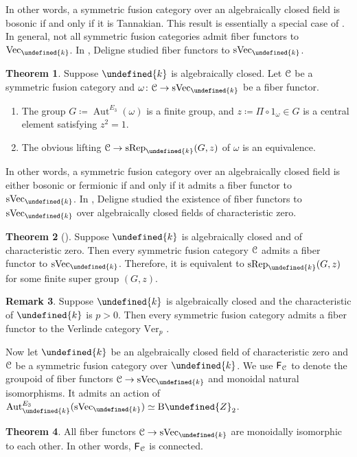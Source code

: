 \documentclass[10pt]{article}
\let\mathbb\undefined
\theoremstyle{definition}
\newtheorem{thm}{Theorem}[section]
\newtheorem{rem}[thm]{Remark}
\numberwithin{equation}{section}
\numberwithin{thm}{section}
\newcommand{\bnu}{\begin{enumerate}}
\newcommand{\enu}{\end{enumerate}}
\newcommand{\Zb}{\mathbb{Z}}
\newcommand{\bk}{\mathbb{k}}
\newcommand{\CC}{\EuScript{C}}
\newcommand{\SF}{\mathsf{F}}
\newcommand{\rmB}{\mathrm{B}}
\DeclareMathOperator{\Aut}{Aut}
\newcommand{\vect}{\mathrm{Vec}}
\newcommand{\svect}{\mathrm{sVec}}
\newcommand{\srep}{\mathrm{sRep}}
\begin{document}
In other words, a symmetric fusion category over an algebraically closed field is bosonic if and only if it is Tannakian. This result is essentially a special case of \cite[Theorem 2.11]{DM82}. In general, not all symmetric fusion categories admit fiber functors to $\vect_\bk$. In \cite[Section 8.19]{Del90}, Deligne studied fiber functors to $\svect_\bk$.

\begin{thm} \label{thm_Deligne_symmetric_fusion_super_lifting}
Suppose $\bk$ is algebraically closed. Let $\CC$ be a symmetric fusion category and $\omega \colon \CC \to \svect_\bk$ be a fiber functor.
\bnu[(1)]
\item The group $G \coloneqq \Aut^{E_3}(\omega)$ is a finite group, and $z \coloneqq \Pi \circ 1_\omega \in G$ is a central element satisfying $z^2 = 1$.
\item The obvious lifting $\CC \to \srep_\bk(G,z)$ of $\omega$ is an equivalence.
\enu
\end{thm}

In other words, a symmetric fusion category over an algebraically closed field is either bosonic or fermionic if and only if it admits a fiber functor to $\svect_\bk$. In \cite{Del02}, Deligne studied the existence of fiber functors to $\svect_\bk$ over algebraically closed fields of characteristic zero.

\begin{thm}[\textnormal{\cite[Corollary 0.8]{Del02}}] \label{thm_Deligne_classificaion_symmetric_fusion_category}
Suppose $\bk$ is algebraically closed and of characteristic zero. Then every symmetric fusion category $\CC$ admits a fiber functor to $\svect_\bk$. Therefore, it is equivalent to $\srep_\bk(G,z)$ for some finite super group $(G,z)$.
\end{thm}

\begin{rem}
Suppose $\bk$ is algebraically closed and the characteristic of $\bk$ is $p > 0$. Then every symmetric fusion category admits a fiber functor to the Verlinde category $\mathrm{Ver}_p$ \cite[Theorem 1.5]{Ost20}.
\end{rem}

Now let $\bk$ be an algebraically closed field of characteristic zero and $\CC$ be a symmetric fusion category over $\bk$. We use $\SF_\CC$ to denote the groupoid of fiber functors $\CC \to \svect_\bk$ and monoidal natural isomorphisms. It admits an action of $\Aut^{E_3}_\bk(\svect_\bk) \simeq \rmB \Zb_2$.

\begin{thm} \label{thm_uniqueness_fiber_functor}
All fiber functors $\CC \to \svect_\bk$ are monoidally isomorphic to each other. In other words, $\SF_\CC$ is connected.
\end{thm}
\end{document}
